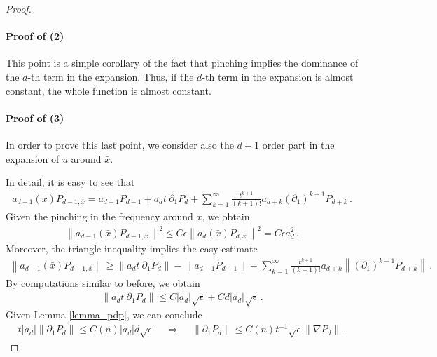 \documentclass[11pt]{article}
\begin{document}
\begin{proof}
\paragraph{Proof of (2)} This point is a simple corollary of the fact that pinching implies the dominance of the $d$-th term in the expansion. Thus, if the $d$-th term in the expansion is almost constant, the whole function is almost constant.
 
\paragraph{Proof of (3)} In order to prove this last point, we consider also the $d-1$ order part in the expansion of $u$ around $\bar x$.
 
 In detail, it is easy to see that 
 \begin{gather}
  a_{d-1}(\bar x) P_{d-1,\bar x} = a_{d-1} P_{d-1} + a_d t \ \partial_1 P_{d}+ \sum_{k=1}^\infty \frac{t^{k+1}}{(k+1)!} a_{d+k}{\left({\partial _1}\right)}^{k+1} P_{d+k} \, .
 \end{gather}
Given the pinching in the frequency around $\bar x$, we obtain
\begin{gather}
 {\left\|{a_{d-1}(\bar x) P_{d-1,\bar x}}\right\|}^2\leq C\epsilon {\left\|{a_{d}(\bar x) P_{d,\bar x}}\right\|}^2 =C\epsilon a_d^2\, .
\end{gather}
Moreover, the triangle inequality implies the easy estimate
\begin{gather}
 {\left\|{a_{d-1}(\bar x) P_{d-1,\bar x}}\right\|} \geq {\left\|{a_d t \ \partial_1 P_d}\right\|} - {\left\|{a_{d-1} P_{d-1}}\right\|} - \sum_{k=1}^\infty \frac{t^{k+1}}{(k+1)!}  a_{d+k}{\left\|{{\left({\partial _1}\right)}^{k+1} P_{d+k}}\right\|}\, .
\end{gather}
By computations similar to before, we obtain
\begin{gather}
 {\left\|{a_d t \ \partial_1 P_d}\right\|} \leq C{\left|{a_d}\right|} \sqrt \epsilon + Cd {\left|{a_d}\right|} \sqrt \epsilon  \, .
\end{gather}
Given Lemma \ref{lemma_pdp}, we can conclude
\begin{gather}
 t {\left|{a_d}\right|} {\left\|{\partial_1 P_d}\right\|} \leq C(n){\left|{a_d}\right|} d \sqrt \epsilon \, \quad \Longrightarrow \quad \, {\left\|{\partial_1 P_d}\right\|} \leq C(n) t^{-1} \sqrt \epsilon {\left\|{\nabla P_d}\right\|}\, .
\end{gather}
\end{proof}
\end{document}
